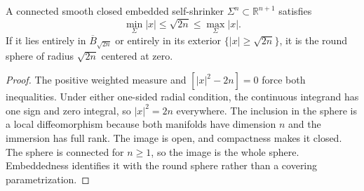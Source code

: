 \begin{corollary}\label{cor:shrinker-radius-constraint}
A connected smooth closed embedded self-shrinker $\Sigma^n\subset\mathbb R^{n+1}$ satisfies
\[
 \min_\Sigma |x|\leq\sqrt{2n}\leq\max_\Sigma |x|.
\]
If it lies entirely in $\overline B_{\sqrt{2n}}$ or entirely in its exterior $\{|x|\geq\sqrt{2n}\}$, it is the round sphere of radius $\sqrt{2n}$ centered at zero.
\end{corollary}
\begin{proof}
The positive weighted measure and $[|x|^2-2n]=0$ force both inequalities. Under either one-sided radial condition, the continuous integrand has one sign and zero integral, so $|x|^2=2n$ everywhere. The inclusion in the sphere is a local diffeomorphism because both manifolds have dimension $n$ and the immersion has full rank. The image is open, and compactness makes it closed. The sphere is connected for $n\geq1$, so the image is the whole sphere. Embeddedness identifies it with the round sphere rather than a covering parametrization.
\end{proof}
